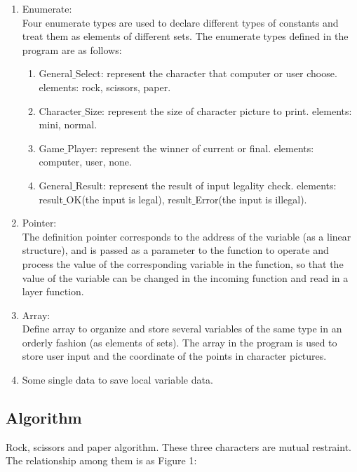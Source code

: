 \documentclass[12pt]{article}
\begin{document}
	\begin{enumerate}
		\item Enumerate:\\
		Four enumerate types are used to declare different types of constants and treat them as elements of different sets. The enumerate types defined in the program are as follows:
		
		\begin{enumerate}[$\bullet$]
			\item General$\_$Select: represent the character that computer or user choose.
			elements: rock, scissors, paper.
			\item Character$\_$Size: represent the size of character picture to print.
			elements: mini, normal.
			\item Game$\_$Player: represent the winner of current or final.
			elements: computer, user, none.
			\item General$\_$Result: represent the result of input legality check.
			elements: result$\_$OK(the input is legal), result$\_$Error(the input is illegal).
		\end{enumerate}
		
		\item Pointer:\\
		The definition pointer corresponds to the address of the variable (as a linear structure), and is passed as a parameter to the function to operate and process the value of the corresponding variable in the function, so that the value of the variable can be changed in the incoming function and read in a layer function.
		
		\item Array:\\
		Define array to organize and store several variables of the same type in an orderly fashion (as elements of sets). The array in the program is used to store user input and the coordinate of the points in character pictures.
		
		\item Some single data to save local variable data.
	\end{enumerate}

	\subsection{Algorithm}
	
	Rock, scissors and paper algorithm. These three characters are mutual restraint. The relationship among them is as Figure 1:
	
\end{document}
